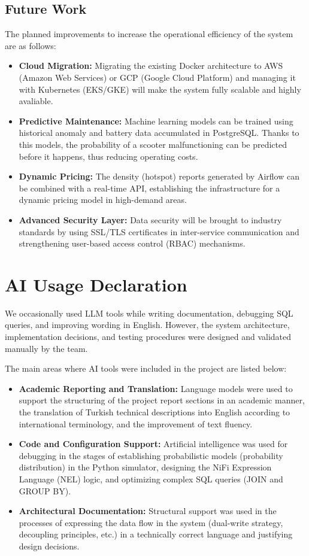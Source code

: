 \documentclass[conference]{IEEEtran}
\begin{document}
\subsection{Future Work}
The planned improvements to increase the operational efficiency of the system are as follows:
\begin{itemize}
   \item \textbf{Cloud Migration:} Migrating the existing Docker architecture to AWS (Amazon Web Services) or GCP (Google Cloud Platform) and managing it with Kubernetes (EKS/GKE) will make the system fully scalable and highly avaliable. \item \textbf{Predictive Maintenance:} Machine learning models can be trained using historical anomaly and battery data accumulated in PostgreSQL. Thanks to this models, the probability of a scooter malfunctioning can be predicted before it happens, thus reducing operating costs. 
   \item \textbf{Dynamic Pricing:} The density (hotspot) reports generated by Airflow can be combined with a real-time API, establishing the infrastructure for a dynamic pricing model in high-demand areas. 
   \item \textbf{Advanced Security Layer:} Data security will be brought to industry standards by using SSL/TLS certificates in inter-service communication and strengthening user-based access control (RBAC) mechanisms. 
\end{itemize}

\section{AI Usage Declaration}

We occasionally used LLM tools while writing documentation, debugging SQL queries, and improving wording in English. However, the system architecture, implementation decisions, and testing procedures were designed and validated manually by the team.

The main areas where AI tools were included in the project are listed below:
\begin{itemize}
\item \textbf{Academic Reporting and Translation:} Language models were used to support the structuring of the project report sections in an academic manner, the translation of Turkish technical descriptions into English according to international terminology, and the improvement of text fluency. 
\item \textbf{Code and Configuration Support:} Artificial intelligence was used for debugging in the stages of establishing probabilistic models (probability distribution) in the Python simulator, designing the NiFi Expression Language (NEL) logic, and optimizing complex SQL queries (JOIN and GROUP BY). 
\item \textbf{Architectural Documentation:} Structural support was used in the processes of expressing the data flow in the system (dual-write strategy, decoupling principles, etc.) in a technically correct language and justifying design decisions.
\end{itemize}
\end{document}
